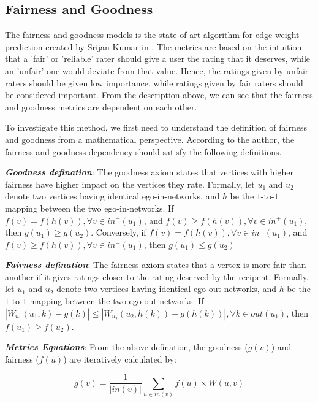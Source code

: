 
\subsection{Fairness and Goodness}

The fairness and goodness models is the state-of-art algorithm for 
edge weight prediction created by Srijan Kumar in \cite{kumar2016edge}.
The metrics are based on the intuition that a 'fair' or 'reliable' 
rater should give a user the rating that it deserves, while an 'unfair'
one would deviate from that value. Hence, the ratings given by unfair 
raters should be given low importance, while ratings given by fair 
raters should be considered important. From the description above,
we can see that the fairness and goodness metrics are dependent on each
other.

To investigate this method, we first need to understand the definition
of fairness and goodness from a mathematical perspective. According to 
the author, the fairness and goodness dependency should satisfy the 
following definitions.

\emph{\textbf{Goodness defination}}: The goodness axiom states that 
vertices with higher fairness have higher impact on the vertices they rate.
Formally, let $u_1$ and $u_2$ denote two vertices having identical ego-in-networks,
and $h$ be the $1$-to-$1$ mapping between the two ego-in-networks. If
$f(v) = f(h(v)), \forall v \in in^-(u_1)$, and $f(v) \geq f(h(v)), \forall v \in in^+(u_1)$,
then $g(u_1) \geq g(u_2)$. Conversely, if $f(v) = f(h(v)), \forall v \in in^+(u_1)$, 
and $f(v) \geq f(h(v)), \forall v \in in^-(u_1)$, then $g(u_1) \leq g(u_2)$

\emph{\textbf{Fairness defination}}: The fairness axiom states that 
a vertex is more fair than another if it gives ratings closer to the rating
deserved by the recipent.
Formally, let $u_1$ and $u_2$ denote two vertices having identical ego-out-networks,
and $h$ be the $1$-to-$1$ mapping between the two ego-out-networks.
If $|W_{u_1}(u_1, k)-g(k)| \leq |W_{u_2}(u_2, h(k))-g(h(k))|, \forall k \in out(u_1)$,
then $f(u_1) \geq f(u_2)$.

\emph{\textbf{Metrics Equations}}: From the above defination, the goodness ($g(v)$) and fairness ($f(u)$) are 
iteratively calculated by:

\begin{equation}
    g(v) = \frac{1}{|in(v)|}\sum_{u \in in(v)}f(u) \times W(u,v)
\end{equation}

